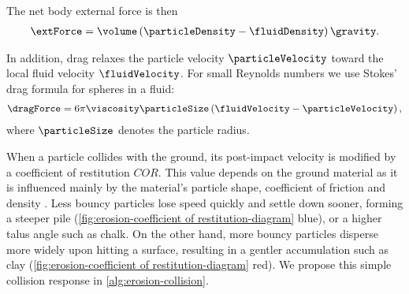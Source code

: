 The net body external force is then
\begin{align}
\label{eq:erosion-bodyforce}
    \extForce = \volume \left(\particleDensity - \fluidDensity\right)\gravity.
\end{align}

In addition, drag relaxes the particle velocity $\particleVelocity$ toward the local fluid velocity $\fluidVelocity$. For small Reynolds numbers we use Stokes' drag formula for spheres in a fluid:
\begin{align}
    \label{eq:erosion-drag}
    \dragForce = 6\pi \viscosity \particleSize \left(\fluidVelocity - \particleVelocity\right),
\end{align}
where $\particleSize$ denotes the particle radius.

    
When a particle collides with the ground, its post-impact velocity is modified by a coefficient of restitution $COR$. This value depends on the ground material as it is influenced mainly by the material's particle shape, coefficient of friction and density \cite{Yan2020}. Less bouncy particles lose speed quickly and settle down sooner, forming a steeper pile (\cref{fig:erosion-coefficient of restitution-diagram} blue), or a higher talus angle such as chalk. On the other hand, more bouncy particles disperse more widely upon hitting a surface, resulting in a gentler accumulation such as clay (\cref{fig:erosion-coefficient of restitution-diagram} red). We propose this simple collision response in \cref{alg:erosion-collision}. 

